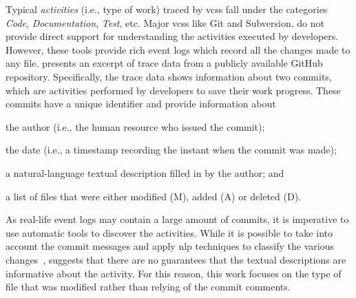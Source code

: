 
%

  
Typical \emph{activities} (i.e., type of work) traced by \glspl{vcs} fall under the categories \textsl{Code}, \textsl{Documentation}, \textsl{Test}, etc. Major \glspl{vcs} like Git and Subversion, do not provide direct support for understanding the activities executed by developers. However, these tools provide rich event logs which record all the changes made to any file. %
 presents an excerpt of trace data from a publicly available GitHub repository. Specifically, the trace data shows information about two commits, which are activities performed by developers to save their work progress. These commits have a unique identifier and provide information about \begin{inparaenum}[\itshape i)]
\item the author (i.e., the human resource who issued the commit);
\item the date (i.e., a timestamp recording the instant when the commit was made);
\item a natural-language textual description filled in by the author; and
\item a list of files that were either modified (M), added (A) or deleted (D).
\end{inparaenum}




As real-life event logs may contain a large amount of commits, it is imperative to use automatic tools to discover the activities. 
While it is possible to take into account the commit messages and apply \gls{nlp} techniques to classify the various changes~\citep{DBLP:conf/edoc/AgrawalATBRT16},  suggests that there are no guarantees that the textual descriptions are informative about the activity. For this reason, this work focuses on the type of file
that was modified rather than relying of the commit comments. 

